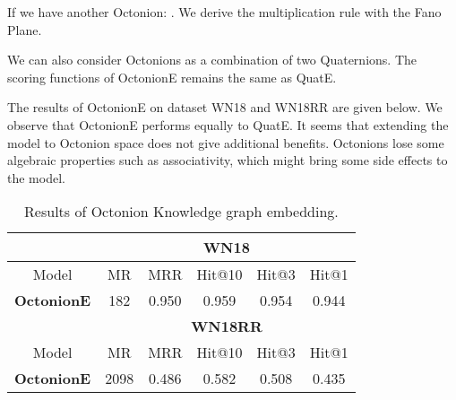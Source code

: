 \documentclass{article}
\begin{document}
If we have another Octonion: . We derive the multiplication rule with the Fano Plane.

We can also consider Octonions as a combination of two Quaternions. The scoring functions of OctonionE remains the same as QuatE.


The results of OctonionE on dataset WN18 and WN18RR are given below. We observe that OctonionE performs equally to QuatE. It seems that extending the model to Octonion space does not give additional benefits. Octonions lose some algebraic properties such as associativity, which might bring some side effects to the model.

\begin{table}[h]
\centering
\caption{Results of Octonion Knowledge graph embedding. }
\begin{tabular}{|c|c|c|c|c|c|}
\hline
          & \multicolumn{5}{c|}{\textbf{WN18}}            \\ \hline
Model     & MR    & MRR & Hit@10 & Hit@3 & Hit@1 \\ \hline
\textbf{OctonionE} & 182 &  0.950& 0.959  & 0.954 & 0.944 \\ \hline
          & \multicolumn{5}{c|}{\textbf{WN18RR}}            \\ \hline
Model     & MR    & MRR & Hit@10 & Hit@3 & Hit@1 \\ \hline
\textbf{OctonionE} & 2098  & 0.486 & 0.582 & 0.508 & 0.435 \\ \hline
\end{tabular}
\end{table}
\end{document}
